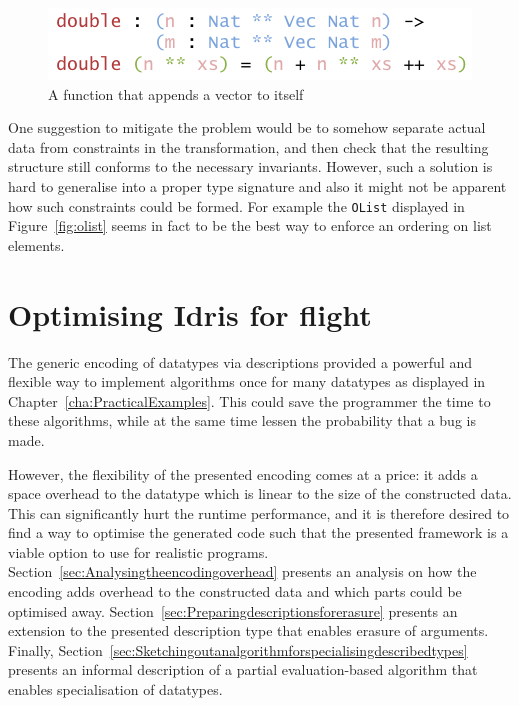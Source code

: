 \documentclass{ituthesis}
\newcommand{\tttype}[1]{\textcolor{type-color}{\texttt{#1}}}
\theoremstyle{break}
\begin{document}
\begin{figure}[ht]
\begin{center}
    \includegraphics[scale=0.5]{Figures/UniplateTransformCounterProofFunc.png}
\end{center}
\caption{A function that appends a vector to itself}
\label{fig:twovecfunc}
\end{figure}

One suggestion to mitigate the problem would be to somehow separate actual data from constraints in the transformation, and then check that the resulting structure still conforms to the necessary invariants.
However, such a solution is hard to generalise into a proper type signature and also it might not be apparent how such constraints could be formed.
For example the \tttype{OList} displayed in Figure~\ref{fig:olist} seems in fact to be the best way to enforce an ordering on list elements.


\chapter{Optimising Idris for flight}
\label{cha:OptimizingIdrisforFlight}

The generic encoding of datatypes via descriptions provided a powerful and flexible way to implement algorithms once for many datatypes as displayed in Chapter~\ref{cha:PracticalExamples}.
This could save the programmer the time to these algorithms, while at the same time lessen the probability that a bug is made.

However, the flexibility of the presented encoding comes at a price: it adds a space overhead to the datatype which is linear to the size of the constructed data.
This can significantly hurt the runtime performance, and it is therefore desired to find a way to optimise the generated code such that the presented framework is a viable option to use for realistic programs.
Section~\ref{sec:Analysingtheencodingoverhead} presents an analysis on how the encoding adds overhead to the constructed data and which parts could be optimised away.
Section~\ref{sec:Preparingdescriptionsforerasure} presents an extension to the presented description type that enables erasure of arguments.
Finally, Section~\ref{sec:Sketchingoutanalgorithmforspecialisingdescribedtypes} presents an informal description of a partial evaluation-based algorithm that enables
specialisation of datatypes.
\end{document}
